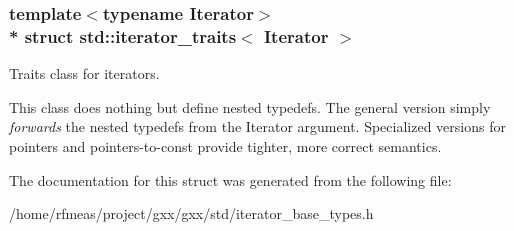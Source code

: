 \subsubsection*{template$<$typename Iterator$>$\\*
struct std\+::iterator\+\_\+traits$<$ Iterator $>$}

Traits class for iterators. 

This class does nothing but define nested typedefs. The general version simply {\itshape forwards} the nested typedefs from the Iterator argument. Specialized versions for pointers and pointers-\/to-\/const provide tighter, more correct semantics. 

The documentation for this struct was generated from the following file\+:\begin{DoxyCompactItemize}
\item 
/home/rfmeas/project/gxx/gxx/std/iterator\+\_\+base\+\_\+types.\+h\end{DoxyCompactItemize}
